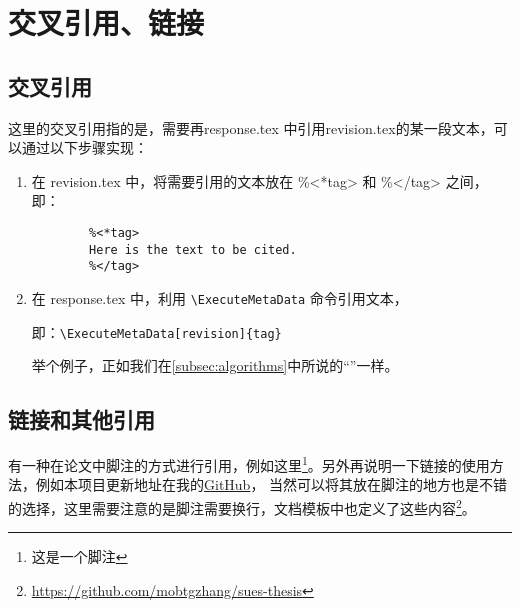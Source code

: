 \chapter{交叉引用、链接}
\section{交叉引用}
这里的交叉引用指的是，需要再response.tex 中引用revision.tex的某一段文本，可以通过以下步骤实现：

\begin{enumerate}[label=\arabic*]
    \item 在 revision.tex 中，将需要引用的文本放在 \%<*tag> 和 \%</tag> 之间，即：
    \begin{lstlisting}
        %<*tag>
        Here is the text to be cited.
        %</tag>
    \end{lstlisting}
    \item 在 response.tex 中，利用 \verb|\ExecuteMetaData| 命令引用文本，

    即：\verb|\ExecuteMetaData[revision]{tag}|

    举个例子，正如我们在\cref{subsec:algorithms}中所说的“”一样。
\end{enumerate}
\section{链接和其他引用}

有一种在论文中脚注的方式进行引用，例如这里\footnote{这是一个脚注}。另外再说明一下链接的使用方法，例如本项目更新地址在我的\href{https://github.com/mobtgzhang/sues-thesis}{GitHub}，
当然可以将其放在脚注的地方也是不错的选择，这里需要注意的是脚注需要换行，文档模板中也定义了这些内容\footnote{\url{https://github.com/mobtgzhang/sues-thesis}}。



